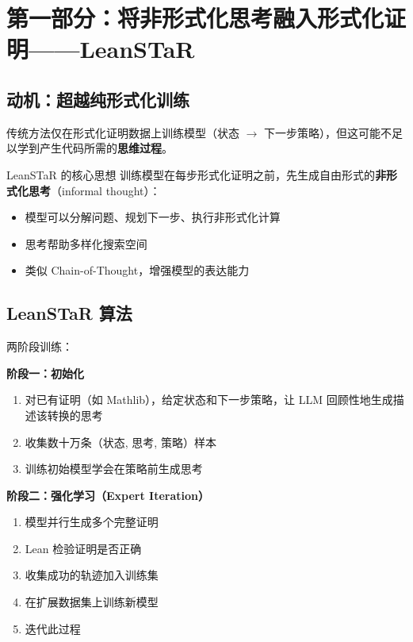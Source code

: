 \section{第一部分：将非形式化思考融入形式化证明——LeanSTaR}

\subsection{动机：超越纯形式化训练}

传统方法仅在形式化证明数据上训练模型（状态 $\to$ 下一步策略），但这可能不足以学到产生代码所需的\textbf{思维过程}。

\begin{importantbox}{LeanSTaR 的核心思想}
训练模型在每步形式化证明之前，先生成自由形式的\textbf{非形式化思考}（informal thought）：
\begin{itemize}
    \item 模型可以分解问题、规划下一步、执行非形式化计算
    \item 思考帮助多样化搜索空间
    \item 类似 Chain-of-Thought，增强模型的表达能力
\end{itemize}
\end{importantbox}

\subsection{LeanSTaR 算法}

两阶段训练：

\textbf{阶段一：初始化}
\begin{enumerate}
    \item 对已有证明（如 Mathlib），给定状态和下一步策略，让 LLM 回顾性地生成描述该转换的思考
    \item 收集数十万条（状态, 思考, 策略）样本
    \item 训练初始模型学会在策略前生成思考
\end{enumerate}

\textbf{阶段二：强化学习（Expert Iteration）}
\begin{enumerate}
    \item 模型并行生成多个完整证明
    \item Lean 检验证明是否正确
    \item 收集成功的轨迹加入训练集
    \item 在扩展数据集上训练新模型
    \item 迭代此过程
\end{enumerate}

